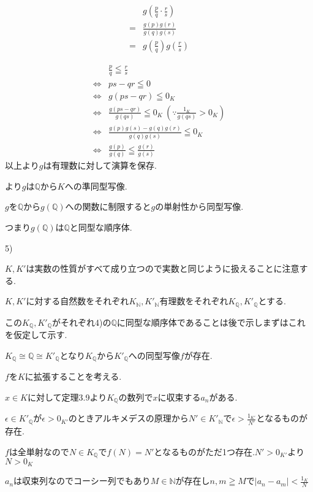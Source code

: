 \documentclass{jsarticle}
\begin{document}
\begin{align*}
&g(\frac{p}{q}\cdot\frac{r}{s})\\
= & \frac{g(p)g(r)}{g(q)g(s)}\\
= & g(\frac{p}{q})g(\frac{r}{s})
\end{align*}

\begin{align*}
&\frac{p}{q}\leqq\frac{r}{s}\\
\Leftrightarrow & ps-qr\leqq0\\
\Leftrightarrow & g(ps-qr)\leqq 0_K\\
\Leftrightarrow & \frac{g(ps-qr)}{g(qs)}\leqq 0_K \ (\because \frac{1_K}{g(qs)}> 0_K)\\
\Leftrightarrow & \frac{g(p)g(s)-g(q)g(r)}{g(q)g(s)}\leqq 0_K\\
\Leftrightarrow & \frac{g(p)}{g(q)}\leqq\frac{g(r)}{g(s)}
\end{align*}
以上より$g$は有理数に対して演算を保存.

より$g$は$\mathbb{Q}$から$K$への準同型写像.

$g$を$\mathbb{Q}$から$g(\mathbb{Q})$への関数に制限すると$g$の単射性から同型写像.

つまり$g(\mathbb{Q})$は$\mathbb{Q}$と同型な順序体.

5)

$K,K'$は実数の性質がすべて成り立つので実数と同じように扱えることに注意する.

$K,K'$に対する自然数をそれぞれ$K_{\mathbb{N}},K'_{\mathbb{N}}$有理数をそれぞれ$K_{\mathbb{Q}},K'_{\mathbb{Q}}$とする.

この$K_{\mathbb{Q}},K'_{\mathbb{Q}}$がそれぞれ4)の$\mathbb{Q}$に同型な順序体であることは後で示しまずはこれを仮定して示す.

$K_{\mathbb{Q}} \cong \mathbb{Q} \cong K'_{\mathbb{Q}}$となり$K_{\mathbb{Q}}$から$K'_{\mathbb{Q}}$への同型写像$f$が存在.

$f$を$K$に拡張することを考える.

$x\in K$に対して定理3.9より$K_{\mathbb{Q}}$の数列で$x$に収束する$a_n$がある.

$\epsilon \in K'_{\mathbb{Q}}$が$\epsilon > 0_{K'}$のときアルキメデスの原理から$N'\in K'_{\mathbb{N}}$で$\epsilon > \frac{1_{K'}}{N'}$となるものが存在.

$f$は全単射なので$N\in K_\mathbb{Q}$で$f(N)=N'$となるものがただ1つ存在.$N' > 0_{K'}$より$N > 0_K$

$a_n$は収束列なのでコーシー列でもあり$M\in\mathbb{N}$が存在し$n,m\geqq M$で$|a_n-a_m|< \frac{1_K}{N}$
\end{document}
